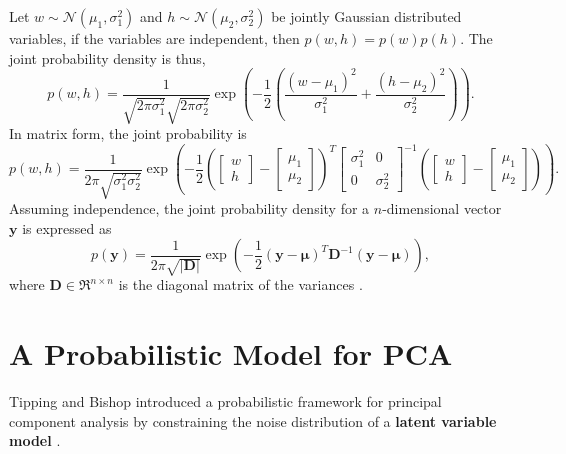 \documentclass[ %
author={Dillon Keith Diep},
supervisor={Dr. Carl Henrik Ek},
degree={MEng},
title={ART-CG Hair:},
subtitle={Assisted Real-time Content Generation of Stylised Virtual Hair},
type={Research},
year={2017} ]{dissertation}
\begin{document}
	Let $w\sim\mathcal{N}(\mu_1, \sigma^2_1)$ and $h\sim\mathcal{N}(\mu_2, \sigma^2_2)$ be jointly Gaussian distributed variables, if the variables are independent, then $p(w,h)=p(w)p(h)$.
	The joint probability density is thus,
	$$p(w,h)=\frac{1}{\sqrt{2\pi\sigma^2_1}\sqrt{2\pi\sigma^2_2}}
	\exp\left(-\frac{1}{2}\left(\frac{(w-\mu_1)^2}{\sigma^2_1}+\frac{(h-\mu_2)^2}{\sigma^2_2}\right)\right).$$
	In matrix form, the joint probability is
	$$p(w,h)=\frac{1}{2\pi\sqrt{\sigma^2_1\sigma^2_2}}\exp
	\left(
	-\frac{1}{2}
	\left(
	\left[
	\begin{matrix}
	w \\
	h
	\end{matrix}
	\right]
	-
	\left[
	\begin{matrix}
	\mu_1 \\
	\mu_2
	\end{matrix}
	\right]
	\right)^T
	\left[
	\begin{matrix}
	\sigma^2_1  &   0\\
	0           &   \sigma^2_2
	\end{matrix}
	\right]^{-1}
	\left(
	\left[
	\begin{matrix}
	w \\
	h
	\end{matrix}
	\right]
	-
	\left[
	\begin{matrix}
	\mu_1 \\
	\mu_2
	\end{matrix}
	\right]
	\right)
	\right).$$
	Assuming independence, the joint probability density for a $n$-dimensional vector $\bm{y}$ is expressed as
	\begin{equation} \label{jointpd}
	p(\bm{y})=\frac{1}{2\pi\sqrt{|\bm{D}|}}\exp\left(-\frac{1}{2}(\bm{y}-\bm{\mu})^T\bm{D}^{-1}(\bm{y}-\bm{\mu})\right),
	\end{equation}
	where $\bm{D}\in\Re^{n \times n}$ is the diagonal matrix of the variances \cite[p.78]{bishop}.
	
	\section{A Probabilistic Model for PCA}
	Tipping and Bishop introduced a probabilistic framework for principal component analysis by constraining the noise distribution of a \textbf{latent variable model} \cite{ppca}.
	
\end{document}
